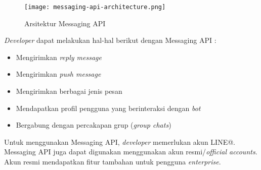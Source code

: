 \begin{figure}[H]
	\centering  
	\texttt{[image: messaging-api-architecture.png]}  
	\caption[Arsitektur Messaging API]{Arsitektur Messaging API} 
	\label{fig:messaging_api_architecture} 
\end{figure}

\textit{Developer} dapat melakukan hal-hal berikut dengan Messaging API :
\begin{itemize}
\item Mengirimkan \textit{reply message}
\item Mengirimkan \textit{push message}
\item Mengirimkan berbagai jenis pesan
\item Mendapatkan profil pengguna yang berinteraksi dengan \textit{bot}
\item Bergabung dengan percakapan grup (\textit{group chats})
\end{itemize}

Untuk menggunakan Messaging API, \textit{developer} memerlukan akun LINE@. Messaging API juga dapat digunakan menggunakan akun resmi/\textit{official accounts}. Akun resmi mendapatkan fitur tambahan untuk pengguna \textit{enterprise}.

